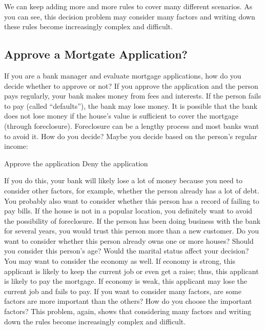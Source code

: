 We can keep adding more and more rules to cover many different
scenarios.  As you can see, this decision problem may consider many
factors and writing down these rules become increasingly complex and
difficult.

\subsection{Approve a Mortgate Application?}

If you are a bank manager and evaluate mortgage applications, how do
you decide whether to approve or not?  If you approve the application
and the person pays regularly, your bank makes money from fees and
interests.  If the person fails to pay (called ``defaults''), the bank
may lose money. It is possible that the bank does not lose money
if the house's value is sufficient to cover the mortgage (through
foreclosure). Foreclosure can be a lengthy process and most banks want
to avoid it.  How do you decide? Maybe you decide based on the
person's regular income:  


\begin{algorithm}[H]
    \begin{algorithmic}[1]
      \State Approve the application
      \Else
      \State Deny the application
      \EndIf
    \end{algorithmic}
\end{algorithm}

If you do this, your bank will likely lose a lot of money because you
need to consider other factors, for example, whether the person
already has a lot of debt. You probably also want to consider whether
this person has a record of failing to pay bills.  If the house is not
in a popular location, you definitely want to avoid the possibility of
foreclosure. If the person has been doing business with the bank for
several years, you would trust this person more than a new customer.
Do you want to consider whether this person already owns one or more
houses?  Should you consider this person's age?  Would the marital
status affect your decision?  You may want to consider the economy as
well. If economy is strong, this applicant is likely to keep the
current job or even get a raise; thus, this applicant is likely to pay
the mortgage. If economy is weak, this applicant may lose the current
job and fails to pay.  If you want to consider many factors, are some
factors are more important than the others? How do you choose the
important factors?  This problem, again, shows that considering many
factors and writing down the rules become increasingly complex and
difficult.

